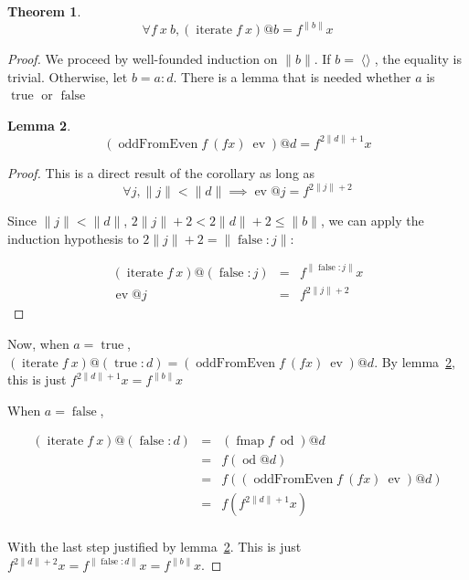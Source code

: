 \documentclass{llncs}
\DeclareMathOperator{\oddFrom}{oddFromEven}
\DeclareMathOperator{\nil}{\langle\rangle}
\DeclareMathOperator{\true}{true}
\DeclareMathOperator{\false}{false}
\DeclareMathOperator{\fmap}{fmap}
\DeclareMathOperator{\iter}{iterate}
\newcommand{\ord}[1]{\|#1\|}
\newcommand{\cons}[2]{#1:#2}
\DeclareMathOperator{\ev}{ev}
\DeclareMathOperator{\od}{od}
\newtheorem{theorem}{Theorem}
\newtheorem{lemma}[theorem]{Lemma}
\begin{document}
\begin{theorem}\label{iterateCorrect}
\begin{displaymath}
\forall f\ x\ b, (\iter f\ x)@b = f^{\ord{b}} x
\end{displaymath}
\end{theorem}
\begin{proof}

We proceed by well-founded induction on $\ord{b}$.
If $b = \nil$, the equality is trivial.
Otherwise, let $b = \cons{a}{d}$.
There is a lemma that is needed whether $a$ is $\true$ or $\false$

\begin{lemma}\label{iterateSublemma}
\begin{displaymath}
(\oddFrom f\ (f x)\ \ev)@d = f^{2\ord{d}+1}x
\end{displaymath}
\end{lemma}
\begin{proof}
This is a direct result of the corollary as long as 
\begin{displaymath}
\forall j, \ord{j} < \ord{d} \implies \ev @j = f^{2\ord{j}+2}
\end{displaymath}

Since $\ord{j} < \ord{d}$, $2\ord{j}+2 < 2\ord{d}+2 \leq \ord{b}$, we can apply the induction hypothesis to $2\ord{j}+2 = \ord{\cons{\false}{j}}$:

\begin{displaymath}
\begin{array}{rcl}
(\iter f\ x)@(\cons{\false}{j}) & = & f^{\ord{\cons{\false}{j}}} x \\
\ev @j & = & f^{2\ord{j}+2}
\end{array}
\end{displaymath}

\end{proof}

Now, when $a = \true$, $(\iter f\ x)@(\cons{\true}{d}) = (\oddFrom f\ (f x)\ \ev)@d$.
By lemma~\ref{iterateSublemma}, this is just $f^{2\ord{d}+1}x = f^{\ord{b}}x$

When $a = \false$, 

\begin{displaymath}
\begin{array}{rcl}
(\iter f\ x)@(\cons{\false}{d}) & = & (\fmap f\ \od)@d \\
& = & f(\od @d) \\
& = & f((\oddFrom f\ (f x)\ \ev)@d) \\
& = & f(f^{2\ord{d}+1}x) \\
\end{array}
\end{displaymath}

With the last step justified by lemma~\ref{iterateSublemma}. This is just $f^{2\ord{d}+2}x = f^{\ord{\cons{\false}{d}}}x = f^{\ord{b}}x$.

\end{proof}
\end{document}
